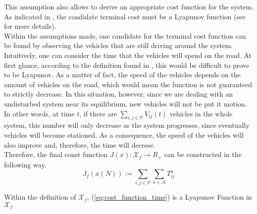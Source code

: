 This assumption also allows to derive an appropriate cost function for the system. As indicated in , the candidate terminal cost must be a Lyapunov function (see  for more details).  \\
Within the assumptions made, one candidate for the terminal cost function can be found by observing the vehicles that are still driving around the system. \\
Intuitively, one can consider the time that the vehicles will spend on the road. At first glance, according to the definition found in , this would be difficult to prove to be Lyapunov. As a matter of fact, the speed of the vehicles depends on the amount of vehicles on the road, which would mean the function is not guaranteed to strictly decrease. In this situation, however, since we are dealing with an undisturbed system near its equilibrium, new vehicles will not be put it motion. In other words, at time $t$, if there are $\sum_{i,j \in \mathcal{V}}V_{ij}(t)$ vehicles in the whole system, this number will only decrease as the system progresses, since eventually vehicles will become stationed. As a consequence, the speed of the vehicles will also improve and, therefore, the time will decrese. \\
Therefore, the final const function $J(x) : \mathcal{X}_f \rightarrow R_+$ can be constructed in the following way. 
\begin{equation}
	J_f(x(N)):= \sum_{i,j \in \mathcal{V}}\sum_{a \in\mathcal{A}}T_{ij}^a
	\label{eq:cost_function_time}
\end{equation}

\begin{proposition}{}
Within the definition of $\mathcal{X}_f$, (\ref{eq:cost_function_time}) is a Lyapunov Function in $\mathcal{X}_f$
\end{proposition}\\

